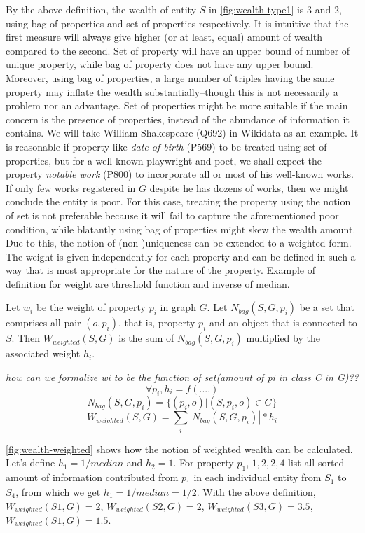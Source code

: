 \documentclass[
]{ceurart}
\begin{document}
By the above definition, the wealth of entity \(S\) in \autoref{fig:wealth-type1} is 3 and 2, using bag of properties and set of properties respectively.
It is intuitive that the first measure will always give higher (or at least, equal) amount of wealth compared to the second. Set of property will have an upper bound of number of unique property, while bag of property does not have any upper bound. Moreover, using bag of properties, a large number of triples having the same property may inflate the wealth substantially--though this is not necessarily a problem nor an advantage. Set of properties might be more suitable if the main concern is the presence of properties, instead of the abundance of information it contains. We will take William Shakespeare (Q692) in Wikidata as an example. It is reasonable if property like  \textit{date of birth} (P569) to be treated using set of properties, but for a well-known playwright and poet, we shall expect the property \textit{notable work} (P800) to incorporate all or most of his well-known works. If only few works registered in \(G\) despite he has dozens of works, then we might conclude the entity is poor. For this case, treating the property using the notion of set is not preferable because it will fail to capture the aforementioned poor condition, while blatantly using bag of properties might skew the wealth amount. Due to this, the notion of (non-)uniqueness can be extended to a weighted form. The weight is given independently for each property and can be defined in such a way that is most appropriate for the nature of the property. Example of definition for weight are threshold function and inverse of median.

Let \(w_i\) be the weight of property \(p_i\) in graph \(G\). Let \(N_{bag}(S,G,p_i)\) be a set that comprises all pair  \((o,p_i)\), that is, property \(p_i\) and an object that is connected to \(S\). Then \(W_{weighted}(S, G)\) is the sum of \(N_{bag}(S,G,p_i)\) multiplied by the associated weight \(h_i\).

\textit{how can we formalize wi to be the function of set(amount of pi in class C in G)??}
\[
    \forall p_i, h_i = f(....)
\]
\[
    N_{bag}(S,G,p_i) = \{(p_i, o) | (S, p_i, o) \in G\}
\]
\[
    W_{weighted}(S, G) = \sum_i |N_{bag}(S,G,p_i)| * h_i
\]

\autoref{fig:wealth-weighted} shows how the notion of weighted wealth can be calculated. Let's define \(h_1 = 1/median\) and \(h_2 = 1\). For property \(p_1\), \({1, 2, 2, 4}\) list all sorted amount of information contributed from \(p_1\) in each individual entity from \(S_1\) to \(S_4\), from which we get \(h_1 = 1/median = 1/2\). With the above definition, \(W_{weighted}(S1, G) = 2\), \(W_{weighted}(S2, G) = 2\), \(W_{weighted}(S3, G) = 3.5\), \(W_{weighted}(S1, G) = 1.5\).
\end{document}
